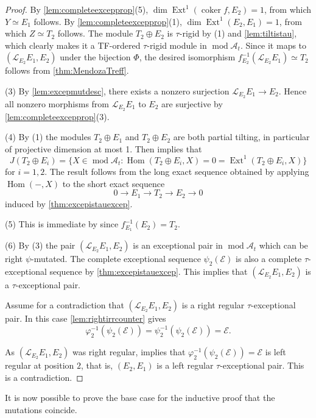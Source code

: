 \documentclass[10pt,twoside, a4paper,reqno]{amsart}
\DeclareMathOperator{\mods}{mod}
\DeclareMathOperator{\Ext}{Ext}
\DeclareMathOperator{\Hom}{Hom}
\DeclareMathOperator{\coker}{coker}
\newcommand{\A}{\mathscr{A}}
\newcommand{\Ecal}{\mathcal{E}}
\newcommand{\Lcal}{\mathcal{L}}
\theoremstyle{definition}
\begin{document}
\begin{proof}
    By \cref{lem:completeexcepprop}(5), $\dim \Ext^1(\coker f, E_2) = 1$, from which $Y \simeq E_1$ follows. By \cref{lem:completeexcepprop}(1), $\dim \Ext^1(E_2, E_1)=1$, from which $Z \simeq T_2$ follows. The module $T_2 \oplus E_2$ is $\tau$-rigid by (1) and \cref{lem:tiltistau}, which clearly makes it a TF-ordered $\tau$-rigid module in $\mods \A_t$. Since it maps to $(\Lcal_{E_2} E_1, E_2)$ under the bijection $\Phi$, the desired isomorphism $f_{E_2}^{-1}(\Lcal_{E_2} E_1) \simeq T_2$ follows from \cref{thm:MendozaTreff}. 


    (3) By \cref{lem:excepmutdesc}, there exists a nonzero surjection $\Lcal_{E_2} E_1 \to E_2$. Hence all nonzero morphisms from $\Lcal_{E_2} E_1$ to $E_2$ are surjective by \cref{lem:completeexcepprop}(3).

    (4) By (1) the modules $T_2 \oplus E_1$ and $T_2 \oplus E_2$ are both partial tilting, in particular of projective dimension at most 1. Then \cite[Cor. IV.4.7]{ARS1995} implies that 
    \[ J(T_2 \oplus E_i) = \{ X \in \mods \A_t : \Hom(T_2 \oplus E_i, X) = 0 = \Ext^1(T_2 \oplus E_i,X) \} \]
    for $i=1,2$. The result follows from the long exact sequence obtained by applying $\Hom(-,X)$ to the short exact sequence
    \[ 0 \to E_1 \to T_2 \to E_2 \to 0 \] 
    induced by \cref{thm:excepistauexcep}.
    
    (5) This is immediate by \cite[Prop. 3.13(a)]{BHM2024} since $f_{E_1}^{-1}(E_2) = T_2$.


    (6) By (3) the pair $(\Lcal_{E_2} E_1, E_2)$ is an exceptional pair in $\mods \A_t$ which can be right $\psi$-mutated. The complete exceptional sequence $\psi_{2}(\Ecal)$ is also a complete $\tau$-exceptional sequence by \cref{thm:excepistauexcep}. This implies that $(\Lcal_{E_2} E_1, E_2)$ is a $\tau$-exceptional pair. 

    Assume for a contradiction that $(\Lcal_{E_2} E_1, E_2)$ is a right regular $\tau$-exceptional pair. In this case \cref{lem:rightirrcounter} gives
    \[ \varphi_2^{-1}(\psi_2(\Ecal)) = \psi_{2}^{-1}(\psi_{2}(\Ecal)) = \Ecal. \]
    
    As $(\Lcal_{E_2} E_1, E_2)$ was right regular, \cite[Def.-Prop. 4.5]{BHM2024} implies that $\varphi_{2}^{-1}(\psi_{2}(\Ecal)) = \Ecal$ is left regular at position $2$, that is, $(E_2, E_1)$ is a left regular $\tau$-exceptional pair. This is a contradiction. 
\end{proof}

It is now possible to prove the base case for the inductive proof that the mutations coincide.
\end{document}
